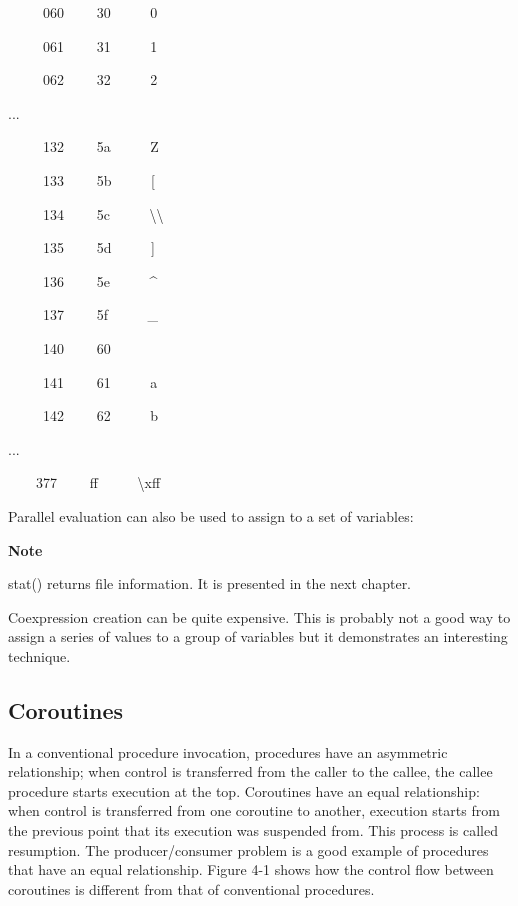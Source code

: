 { \ \ \ \ \ 060 \ \ \ \ 30 \ \ \ \ \ {\textquotedbl}0{\textquotedbl}}

{ \ \ \ \ \ 061 \ \ \ \ 31 \ \ \ \ \ {\textquotedbl}1{\textquotedbl}}

{ \ \ \ \ \ 062 \ \ \ \ 32 \ \ \ \ \ {\textquotedbl}2{\textquotedbl}}

{\sffamily
...}

{ \ \ \ \ \ 132 \ \ \ \ 5a \ \ \ \ \ {\textquotedbl}Z{\textquotedbl}}

{ \ \ \ \ \ 133 \ \ \ \ 5b \ \ \ \ \ {\textquotedbl}[{\textquotedbl}}

{ \ \ \ \ \ 134 \ \ \ \ 5c
\ \ \ \ \ {\textquotedbl}{\textbackslash}{\textbackslash}{\textquotedbl}}

{ \ \ \ \ \ 135 \ \ \ \ 5d \ \ \ \ \ {\textquotedbl}]{\textquotedbl}}

{ \ \ \ \ \ 136 \ \ \ \ 5e
\ \ \ \ \ {\textquotedbl}\^{}{\textquotedbl}}

{ \ \ \ \ \ 137 \ \ \ \ 5f \ \ \ \ \ {\textquotedbl}\_{\textquotedbl}}

{ \ \ \ \ \ 140 \ \ \ \ 60
\ \ \ \ \ {\textquotedbl}{\textasciigrave}{\textquotedbl}}

{ \ \ \ \ \ 141 \ \ \ \ 61 \ \ \ \ \ {\textquotedbl}a{\textquotedbl}}

{ \ \ \ \ \ 142 \ \ \ \ 62 \ \ \ \ \ {\textquotedbl}b{\textquotedbl}}

{\sffamily
...}

{ \ \ \ \ 377 \ \ \ \ ff
\ \ \ \ \ {\textquotedbl}{\textbackslash}xff{\textquotedbl}}

\noindent
Parallel evaluation can also be used to assign to a set of variables:



{\sffamily\bfseries
Note}

{\sffamily
stat() returns file information. It is presented in the next chapter.}

Coexpression creation can be quite expensive. This is probably not a
good way to assign a series of values to a group of variables but it
demonstrates an interesting technique.

\subsection{Coroutines}
In a conventional procedure invocation, procedures have an asymmetric
relationship; when control is transferred from the caller to the
callee, the callee procedure starts execution at the top. Coroutines
have an equal relationship: when control is transferred from one
coroutine to another, execution starts from the previous point that its
execution was suspended from. This process is called resumption. The
producer/consumer problem is a good example of
procedures that have an equal relationship. Figure 4-1 shows how the
control flow between coroutines is different from that of conventional
procedures.

